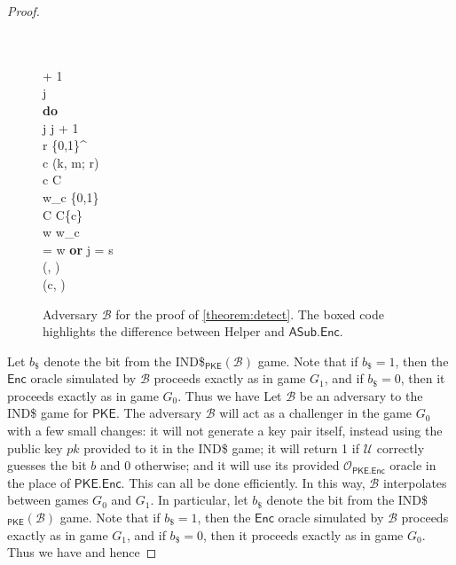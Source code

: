 \begin{proof}
\begin{figure}
\begin{pchstack}
\begin{pcvstack}
{	\pcind {} \\
	\pcelse \\
	\pcind \sigma \leftarrow \sigma + 1 \\
	j  \\
	\textbf{do} \\
	\pcind j \leftarrow j + 1 \\
	\pcind r \sample \{0,1\}^ \\
	\pcind c \leftarrow {}(k, m; r) \\
	\pcind \pcif c \notin C \pcthen \\
	\pcind \pcind w_c \sample \{0,1\} \\
	\pcind \pcind C \leftarrow C\cup \{c\} \\
	\pcind w \leftarrow w_c \\
	\pcuntil \kappa[\sigma] = w \textbf{ or } j = s \\
	\tau \leftarrow (\sigma, \kappa) \\
	\pcreturn (c, \tau)
}
\end{pcvstack}
\end{pchstack}
\caption[Adversary $\mathcal{B}$ for the proof of \autoref{theorem:detect}]{Adversary $\mathcal{B}$ for the proof of \autoref{theorem:detect}. The boxed code highlights the difference between \textsf{Helper} and $\mathsf{ASub.Enc}$.}
\label{game:B}
\end{figure}

Let $b_\$$ denote the bit from the IND\$$_\mathsf{PKE}(\mathcal{B})$ game. Note that if $b_\$=1$, then the $\mathsf{Enc}$ oracle simulated by $\mathcal{B}$ proceeds exactly as in game $G_1$, and if  $b_\$=0$, then it proceeds exactly as in game $G_0$. Thus we have
\else
Let $\mathcal{B}$ be an adversary to the IND\$ game for $\mathsf{PKE}$. The adversary $\mathcal{B}$ will act as a challenger in the game $G_0$ with a few small changes: it will not generate a key pair itself, instead using the public key $pk$ provided to it in the IND\$ game; it will return 1 if $\mathcal{U}$ correctly guesses the bit $b$ and 0 otherwise; and it will use its provided $\mathcal{O}_\mathsf{PKE.Enc}$ oracle in the place of $\mathsf{PKE.Enc}$. This can all be done efficiently. In this way, $\mathcal{B}$ interpolates between games $G_0$ and $G_1$. In particular, let $b_\$$ denote the bit from the IND\$$_\mathsf{PKE}(\mathcal{B})$ game. Note that if $b_\$=1$, then the $\mathsf{Enc}$ oracle simulated by $\mathcal{B}$ proceeds exactly as in game $G_1$, and if  $b_\$=0$, then it proceeds exactly as in game $G_0$. Thus we have
\fi
{}
and hence


\end{proof}
